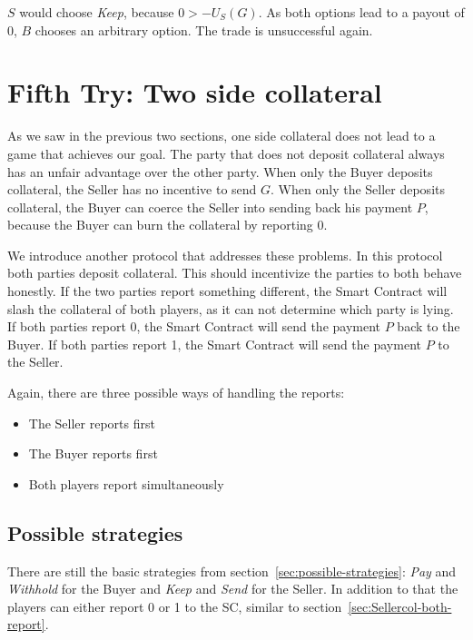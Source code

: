 \documentclass{cacthesis}
\begin{document}
$S$ would choose \emph{Keep}, because $0>-U_S(G)$.
As both options lead to a payout of 0, $B$ chooses an arbitrary option. The trade is unsuccessful again.


\section{Fifth Try: Two side collateral}
\label{sec:two-side-collateral}
As we saw in the previous two sections, one side collateral does not lead to a game that achieves our goal. The party that does not deposit collateral always has an unfair advantage over the other party.
When only the Buyer deposits collateral, the Seller has no incentive to send $G$.
When only the Seller deposits collateral, the Buyer can coerce the Seller into sending back his payment $P$, because the Buyer can burn the collateral by reporting 0.\newline 

We introduce another protocol that addresses these problems. In this protocol both parties deposit collateral. This should incentivize the parties to both behave honestly.
If the two parties report something different, the Smart Contract will slash the collateral of both players, as it can not determine which party is lying. If both parties report 0, the Smart Contract will send the payment $P$ back to the Buyer. If both parties report 1, the Smart Contract will send the payment $P$ to the Seller.  \newline

Again, there are three possible ways of handling the reports:
\begin{itemize}
    \item The Seller reports first
    \item The Buyer reports first
    \item Both players report simultaneously
\end{itemize}
\subsection{Possible strategies}
There are still the basic strategies from section~\ref{sec:possible-strategies}: \emph{Pay} and \emph{Withhold} for the Buyer and \emph{Keep} and \emph{Send} for the Seller. In addition to that the players can either report 0 or 1 to the SC, similar to section~\ref{sec:Sellercol-both-report}.
\end{document}
